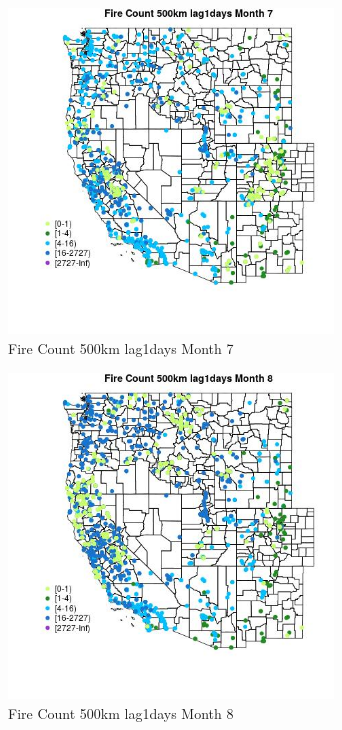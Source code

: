 \begin{figure} 
\centering  
\includegraphics[width=0.77\textwidth]{Code_Outputs/Report_ML_input_PM25_Step4_part_f_de_duplicated_aveswNAs_MapObsMo7Fire_Count_500km_lag1days.jpg} 
\caption{\label{fig:Report_ML_input_PM25_Step4_part_f_de_duplicated_aveswNAsMapObsMo7Fire_Count_500km_lag1days}Fire Count 500km lag1days Month 7} 
\end{figure} 
 

\begin{figure} 
\centering  
\includegraphics[width=0.77\textwidth]{Code_Outputs/Report_ML_input_PM25_Step4_part_f_de_duplicated_aveswNAs_MapObsMo8Fire_Count_500km_lag1days.jpg} 
\caption{\label{fig:Report_ML_input_PM25_Step4_part_f_de_duplicated_aveswNAsMapObsMo8Fire_Count_500km_lag1days}Fire Count 500km lag1days Month 8} 
\end{figure} 
 

